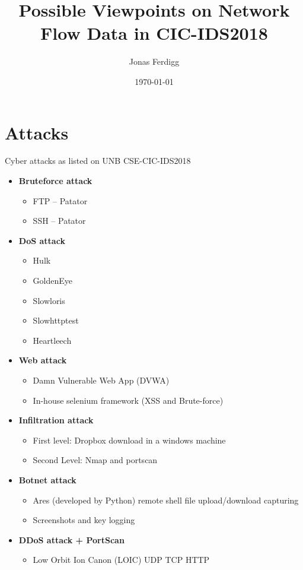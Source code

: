 \documentclass[11pt]{article}
\title{ Possible Viewpoints on Network Flow Data in CIC-IDS2018}
\author{ Jonas Ferdigg }
\date{\today}
\begin{document}
\maketitle	
\pagebreak

\tableofcontents
\pagebreak


\section{Attacks}

Cyber attacks as listed on UNB CSE-CIC-IDS2018 \cite{cic_ids2018} 

\begin{itemize}
	\item \textbf{Bruteforce attack}
	\begin{itemize}
		\item FTP – Patator
		\item SSH – Patator
	\end{itemize}
		
	\item \textbf{DoS attack}
	\begin{itemize}
		\item Hulk
		\item GoldenEye
		\item Slowloris
		\item Slowhttptest
		\item Heartleech
	\end{itemize}
	\item \textbf{Web attack}
	\begin{itemize}
		\item Damn Vulnerable Web App (DVWA)
		\item In-house selenium framework (XSS and Brute-force)
	\end{itemize}

	\item \textbf{Infiltration attack} 	
	\begin{itemize}
		\item First level: Dropbox download in a windows machine
		\item Second Level: Nmap and portscan
	\end{itemize}

	\item \textbf{Botnet attack}
	\begin{itemize}
		\item Ares (developed by Python)
			\subsubitem remote shell
			\subsubitem file upload/download
			\subsubitem capturing 
		\item Screenshots and key logging
	\end{itemize}

	\item \textbf{DDoS attack + PortScan}
	\begin{itemize}
		\item Low Orbit Ion Canon (LOIC)
			\subsubitem UDP
			\subsubitem TCP
			\subsubitem HTTP
	\end{itemize}
\end{itemize}
\end{document}
